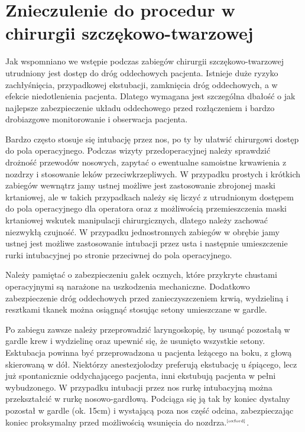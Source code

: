 \documentclass[a4paper, 12pt]{report}
\newcommand\cyt[1]{$^{\tiny{\cite{#1}}}$}
\begin{document}
\chapter{Znieczulenie do procedur w chirurgii szczękowo-twarzowej}

Jak wspomniano we wstępie podczas zabiegów chirurgii
szczękowo-twarzowej utrudniony jest dostęp do dróg oddechowych
pacjenta. Istnieje duże ryzyko zachłyśnięcia, przypadkowej ekstubacji,
zamknięcia dróg oddechowych, a w efekcie niedotlenienia
pacjenta. Dlatego wymagana jest szczególna dbałość o jak najlepsze
zabezpieczenie układu oddechowego przed rozłączeniem i bardzo
drobiazgowe monitorowanie i obserwacja pacjenta. 

Bardzo często stosuje się intubację przez nos, po ty by ułatwić
chirurgowi dostęp do pola operacyjnego. Podczas wizyty
przedoperacyjnej należy sprawdzić drożność przewodów nosowych, zapytać
o ewentualne samoistne krwawienia z nozdrzy i stosowanie leków
przeciwkrzepliwych. W przypadku prostych i krótkich zabiegów wewnątrz
jamy ustnej możliwe jest zastosowanie zbrojonej maski krtaniowej, ale
w takich przypadkach należy się liczyć z utrudnionym dostępem do pola
operacyjnego dla operatora oraz z możliwością przemieszczenia maski
krtaniowej wskutek manipulacji chirurgicznych, dlatego należy zachować
niezwykłą czujność. W przypadku jednostronnych zabiegów w obrębie jamy
ustnej jest możliwe zastosowanie intubacji przez usta i następnie
umieszczenie rurki intubacyjnej po stronie przeciwnej do pola
operacyjnego.

Należy pamiętać o zabezpieczeniu gałek ocznych, które przykryte
chustami operacyjnymi są narażone na uszkodzenia
mechaniczne. Dodatkowo zabezpieczenie dróg oddechowych przed
zanieczyszczeniem krwią, wydzieliną i resztkami tkanek można osiągnąć
stosując setony umieszczane w gardle.

Po zabiegu zawsze należy przeprowadzić laryngoskopię, by usunąć
pozostałą w gardle krew i wydzielinę oraz upewnić się, że usunięto
wszystkie setony. Esktubacja powinna być przeprowadzona u pacjenta
leżącego na boku, z głową skierowaną w dół. Niektórzy anestezjolodzy
preferują ekstubację u śpiącego, lecz już spontanicznie oddychającego
pacjenta, inni ekstubują pacjenta w pełni wybudzonego. W przypadku
intubacji przez nos rurkę intubacyjną można przekształcić w rurkę
nosowo-gardłową. Podciąga się ją tak by koniec dystalny pozostał w
gardle (ok. 15cm) i wystającą poza nos część odcina, zabezpieczając
koniec proksymalny przed możliwością wsunięcia do
nozdrza.\cyt{oxford}.
\end{document}

